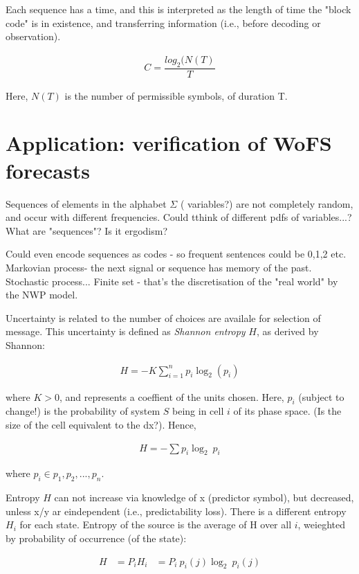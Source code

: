 \documentclass{ametsoc}
\begin{document}
Each sequence has a time, and this is interpreted as the length of time the "block code" is in existence, and transferring information (i.e., before decoding or observation).

\begin{align}\label{eq:C2}
    C = \dfrac{log_2(N(T)}{T}
\end{align}

Here, $N(T)$ is the number of permissible symbols, of duration T.

\section{Application: verification of WoFS forecasts}
Sequences of elements in the alphabet $\Sigma$ ( variables?) are not completely random, and occur with different frequencies. Could tthink of different pdfs of variables...? What are "sequences"? Is it ergodism? 

Could even encode sequences as codes - so frequent sentences could be 0,1,2 etc. Markovian process- the next signal or sequence has memory of the past. Stochastic process... Finite set - that's the discretisation of the "real world" by the NWP model.

Uncertainty is related to the number of choices are availale for selection of message. This uncertainty is defined as \emph{Shannon entropy} $H$, as derived by Shannon:

\begin{align}\label{eq:H}
    H = -K \sum^{n}_{i=1} p_i \log_2(p_i)
\end{align}

where $K > 0$, and represents a coeffient of the units chosen. Here, $p_i$ (subject to change!) is the probability of system $S$ being in cell $i$ of its phase space. (Is the size of the cell equivalent to the dx?). Hence,

\begin{align}
	H = -\sum p_i \log_2~p_i
\end{align}

where $p_i \in {p_1, p_2, ... , p_n}$. 

Entropy $H$ can not increase via knowledge of x (predictor symbol), but decreased, unless x/y ar eindependent (i.e., predictability loss). There is a different entropy $H_i$ for each state. Entropy of the source is the average of H over all $i$, weieghted by probability of occurrence (of the state):

\begin{align}
   H &= P_i H_i
     &= P_i~p_i(j)\log_2~p_i(j)
\end{align}
\end{document}
